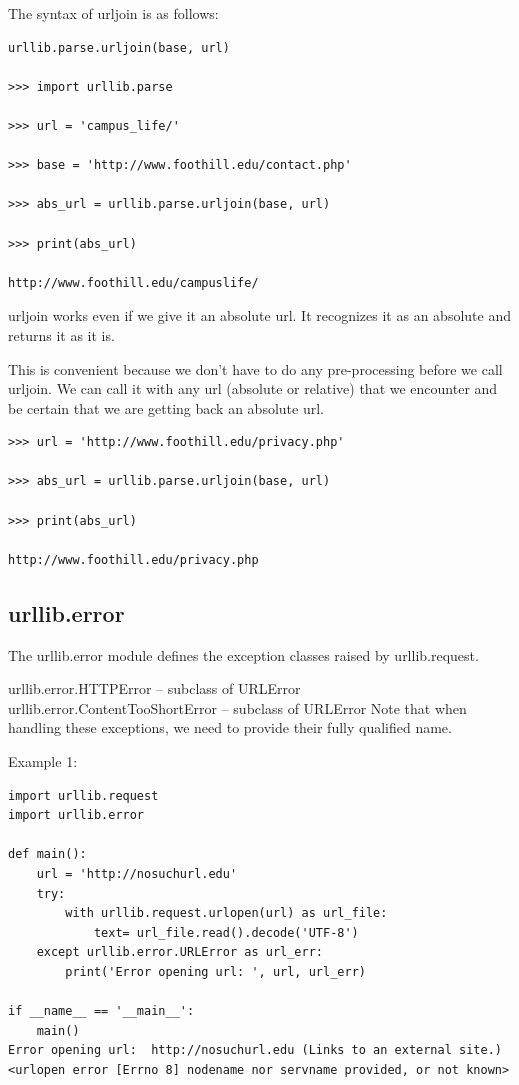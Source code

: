 \documentclass{article}
\begin{document}
The syntax of urljoin is as follows:

\begin{lstlisting}
urllib.parse.urljoin(base, url)

>>> import urllib.parse 

>>> url = 'campus_life/'

>>> base = 'http://www.foothill.edu/contact.php'

>>> abs_url = urllib.parse.urljoin(base, url)

>>> print(abs_url)

http://www.foothill.edu/campuslife/
\end{lstlisting}

urljoin works even if we give it an absolute url.  It recognizes it as an absolute and returns it as it is.

This is convenient because we don’t have to do  any pre-processing before we call urljoin.  We can call it with any url (absolute or relative) that we encounter and be certain that we are getting back an absolute url.

\begin{lstlisting}
>>> url = 'http://www.foothill.edu/privacy.php'

>>> abs_url = urllib.parse.urljoin(base, url)

>>> print(abs_url)

http://www.foothill.edu/privacy.php
\end{lstlisting}

\subsection{urllib.error}
The urllib.error module defines the  exception classes raised by urllib.request.

urllib.error.HTTPError – subclass of URLError
urllib.error.ContentTooShortError – subclass of URLError
Note that when handling these exceptions, we need to provide their fully qualified name.

Example 1:
\begin{lstlisting}
import urllib.request
import urllib.error
 
def main():
    url = 'http://nosuchurl.edu'
    try:
        with urllib.request.urlopen(url) as url_file:
            text= url_file.read().decode('UTF-8')
    except urllib.error.URLError as url_err:
        print('Error opening url: ', url, url_err)
 
if __name__ == '__main__':
    main()
Error opening url:  http://nosuchurl.edu (Links to an external site.) <urlopen error [Errno 8] nodename nor servname provided, or not known>
\end{lstlisting}
\end{document}
